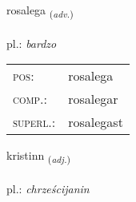 \documentclass[frontgrid, backgrid]{flacards}\usepackage[]{graphicx}\usepackage[]{xcolor}
\begin{document}
\renewcommand{\flhead}{\vskip5pt \fboxsep=0pt {\small\bfseries\footnotesize Atviksorð | Adverb}}
\renewcommand{\fcfoot}{\vskip5pt \fboxsep=0pt \hspace{2pt}{\small\bfseries\footnotesize 2K}}

\renewcommand{\blhead}{\vskip5pt {\small\bfseries\footnotesize Atviksorð | Adverb }}
\renewcommand{\bcfoot}{\vskip5pt \hspace{2pt}{\small\bfseries\footnotesize 2K}}


{rosalega \small{\textsubscript{(\textit{adv.})}} \\[1ex] %
\textphonetic{[rɔːsalɛɣa]} \\
pl.: \emph{bardzo} \\  [2ex]
\renewcommand*{\arraystretch}{0.8}
\begin{tabular}{ll}
\textsc{pos}: & rosalega \\ 
\textsc{comp.}: & rosalegar \\ 
\textsc{superl.}: & rosalegast \\
\end{tabular}
}

\renewcommand{\flhead}{\vskip5pt \fboxsep=0pt {\small\bfseries\footnotesize Lýsingarorð | Adjective}}
\renewcommand{\fcfoot}{\vskip5pt \fboxsep=0pt \hspace{2pt}{\small\bfseries\footnotesize 2K}}

\renewcommand{\blhead}{\vskip5pt {\small\bfseries\footnotesize Lýsingarorð | Adjective }}
\renewcommand{\bcfoot}{\vskip5pt \hspace{2pt}{\small\bfseries\footnotesize 2K}}


{kristinn \small{\textsubscript{(\textit{adj.})}} \\[1ex] %
\textphonetic{[kʰrɪstɪn]} \\
pl.: \emph{chrześcijanin} \\  [2ex]
\renewcommand*{\arraystretch}{0.8}
}
\end{document}
